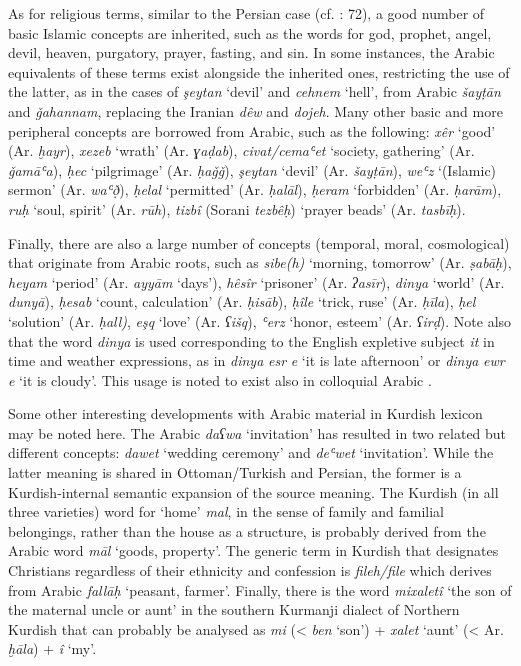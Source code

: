 \documentclass[output=paper]{langsci/langscibook}
\begin{document}
As for religious terms, similar to the Persian case (cf. \citealt{Perry2012}: 72), a good number of basic Islamic concepts are inherited, such as the words for god, prophet, angel, devil, heaven, purgatory, prayer, fasting, and sin. In some instances, the Arabic equivalents of these terms exist alongside the inherited ones, restricting the use of the latter, as in the cases of \textit{şeytan} ‘devil’ and \textit{cehnem} ‘hell’, from Arabic \textit{šayṭān} and \textit{ǧahannam}, replacing the Iranian \textit{dêw} and \textit{dojeh}. Many other basic and more peripheral concepts are borrowed from Arabic, such as the following: \textit{xêr} ‘good’ (Ar. \textit{ḫayr}), \textit{xezeb} ‘wrath’ (Ar. \textit{ɣaḍab}), \textit{civat/cemaʿet} ‘society, gathering’ (Ar. \textit{ǧamāʿa}), \textit{ḥec} ‘pilgrimage’ (Ar. \textit{ḥaǧǧ}), \textit{şeytan} ‘devil’ (Ar. \textit{šayṭān}), \textit{weʿz} ‘(Islamic) sermon’ (Ar. \textit{waʿð̣}), \textit{ḥelal} ‘permitted’ (Ar. \textit{ḥalāl}), \textit{ḥeram} ‘forbidden’ (Ar. \textit{ḥarām}), \textit{ruḥ} ‘soul, spirit’ (Ar. \textit{rūh}), \textit{tizbî} (Sorani \textit{tezbêḥ}) ‘prayer beads’ (Ar. \textit{tasbīḥ}).  

Finally, there are also a large number of concepts (temporal, moral, cosmological) that originate from Arabic roots, such as \textit{sibe(h)} ‘morning, tomorrow’ (Ar. \textit{ṣabāḥ}), \textit{heyam} ‘period’ (Ar. \textit{ayyām} ‘days’), \textit{hêsîr} ‘prisoner’ (Ar. \textit{ʔasīr}), \textit{dinya} ‘world’ (Ar. \textit{dunyā}), \textit{ḥesab} ‘count, calculation’ (Ar. \textit{ḥisāb}), \textit{ḥîle} ‘trick, ruse’ (Ar. \textit{ḥīla}), \textit{ḥel}  ‘solution’ (Ar. \textit{ḥall)}, \textit{eşq} ‘love’ (Ar. \textit{ʕišq}), \textit{ʿerz} ‘honor, esteem’ (Ar. \textit{ʕirḍ}). Note also that the word \textit{dinya} is used corresponding to the English expletive subject \textit{it} in time and weather expressions, as in \textit{dinya} \textit{esr} \textit{e} ‘it is late afternoon’ or \textit{dinya} \textit{ewr} \textit{e} ‘it is cloudy’. This usage is noted to exist also in colloquial Arabic \citep[155]{Chyet2003}.

Some other interesting developments with Arabic material in Kurdish lexicon may be noted here. The Arabic \textit{daʕwa} ‘invitation’ has resulted in two related but different concepts: \textit{dawet} ‘wedding ceremony’ and \textit{deʿwet} ‘invitation’. While the latter meaning is shared in Ottoman/Turkish and Persian, the former is a Kurdish-internal semantic expansion of the source meaning. The Kurdish (in all three varieties) word for ‘home’ \textit{mal}, in the sense of family and familial belongings, rather than the house as a structure, is probably derived from the Arabic word \textit{māl} ‘goods, property’. The generic term in Kurdish that designates Christians regardless of their ethnicity and confession is \textit{fileh/file} which derives from Arabic \textit{fallāḥ} ‘peasant, farmer’. Finally, there is the word \textit{mixaletî} ‘the son of the maternal uncle or aunt’ in the southern Kurmanji dialect of Northern Kurdish that can probably be analysed as \textit{mi} (< \textit{ben} ‘son’) + \textit{xalet} ‘aunt’ (< Ar. \textit{ḫāla}) + \textit{î} ‘my’.
\end{document}
